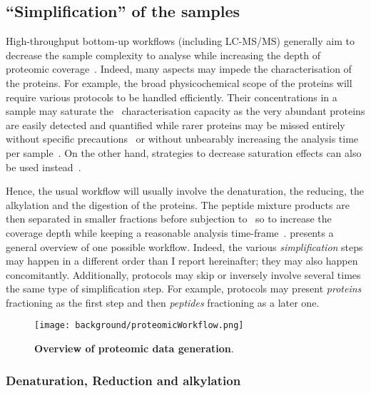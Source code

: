 \subsection{\enquote{Simplification} of the samples}\label{subsec:simpleProt}

High-throughput bottom-up workflows (including \gls{LC-MS/MS}) generally
aim to decrease the sample complexity to analyse while increasing the depth
of proteomic coverage~. Indeed,
many aspects may impede the characterisation of the proteins.
For example, the broad physicochemical scope of the proteins will
require various protocols to be handled efficiently.
Their concentrations in a sample may saturate the \ms\ characterisation capacity
as the very abundant proteins are easily detected and quantified while rarer
proteins may be missed entirely without specific precautions~ or without unbearably increasing the
analysis time per sample~.
On the other hand, strategies to decrease saturation effects can also be used
instead~.

Hence, the usual workflow will usually involve the denaturation, the reducing,
the alkylation and the digestion of the proteins. The peptide mixture products
are then separated in smaller fractions before subjection to \ms\ so to increase
the coverage depth
while keeping a reasonable analysis time-frame~.
 presents a general overview of one possible workflow.
Indeed, the various \emph{simplification} steps may happen in a different order
than I report hereinafter; they may also happen concomitantly. Additionally,
protocols may skip or inversely involve several times the same type of
simplification step. For example, protocols may present
\emph{proteins} fractioning as the first step
and then \emph{peptides} fractioning as a later one.

\begin{figure}[!htpb]
    \texttt{[image: background/proteomicWorkflow.png]}\centering
    \caption[Overview of proteomic data generation]{\label{fig:proteomics}%
    \textbf{Overview of proteomic data generation}.}
\end{figure}

\subsubsection{Denaturation, Reduction and alkylation}

